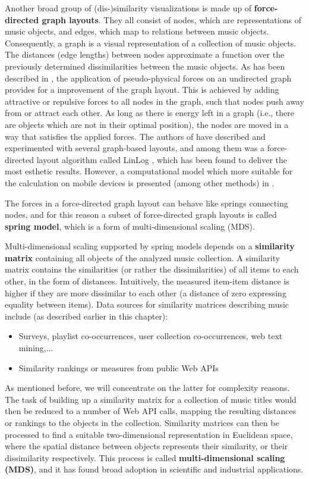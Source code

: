 Another broad group of (dis-)similarity visualizations is made up of \textbf{force-directed graph layouts}. They all consist of nodes, which are representations of music objects, and edges, which map to relations between music objects. Consequently, a graph is a visual representation of a collection of music objects. The distances (edge lengths) between nodes approximate a function over the previously determined dissimilarities between the music objects.
As has been described in \cite{gansner:1998}, the application of pseudo-physical forces on an undirected graph provides for a improvement of the graph layout. This is achieved by adding attractive or repulsive forces to all nodes in the graph, such that nodes push away from or attract each other. As long as there is energy left in a graph (i.e., there are objects which are not in their optimal position), the nodes are moved in a way that satisfies the applied forces. The authors of \cite{Muelder:2010fk} have described and experimented with several graph-based layouts, and among them was a force-directed layout algorithm called LinLog \cite{noack:2003}, which has been found to deliver the most esthetic results. However, a computational model which more suitable for the calculation on mobile devices is presented (among other methods) in \cite{Kobourov04}.

The forces in a force-directed graph layout can behave like springs connecting nodes, and for this reason a subset of force-directed graph layouts is called \textbf{spring model}, which is a form of multi-dimensional scaling (MDS). 


Multi-dimensional scaling supported by spring models depends on a \textbf{similarity matrix} containing all objects of the analyzed music collection. A similarity matrix contains
the similarities (or rather the dissimilarities) of all items to each other, in the form of distances.
Intuitively, the measured item-item distance is higher if they are more dissimilar to each other (a distance of
zero expressing equality between items). Data sources for similarity matrices describing music include 
(as described earlier in this chapter):
\begin{itemize}
	\item Surveys, playlist co-occurrences, user collection co-occurrences, web text mining,... 
	\item Similarity rankings or measures from public Web APIs
\end{itemize}
As mentioned before, we will concentrate on the latter for complexity reasons. The task of building up a 
similarity matrix for a collection of music titles would then be reduced to a number of Web API calls, mapping the
resulting distances or rankings to the objects in the collection. Similarity matrices can then be processed
to find a suitable two-dimensional representation in Euclidean space, where the spatial distance between
objects represents their similarity, or their dissimilarity respectively. This process is called \textbf{multi-dimensional scaling (MDS)}, and it has found broad adoption in scientific and industrial applications. 


